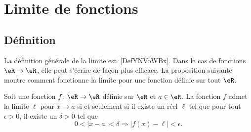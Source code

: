 
\section{Limite de fonctions}

\subsection{Définition}

La définition générale de la limite est~\ref{DefYNVoWBx}. Dans le cas de fonctions \( \eR\to \eR\), elle peut s'écrire de façon plus efficace. La proposition suivante montre comment fonctionne la limite pour une fonction définie sur tout \( \eR\).

\begin{proposition}       \label{PropAJQQooQQClfp}
	Soit une fonction \( f\colon \eR\to \eR\) définie sur \( \eR\) et \( a\in \eR\). La fonction \( f\) admet la limite \( \ell\) pour \( x\to a\) si et seulement si il existe un réel \( \ell\) tel que pour tout \( \epsilon>0\), il existe un \( \delta>0\) tel que
	\begin{equation}\label{EqDefLimiteFonction}
		0<| x-a |<\delta\Rightarrow| f(x)-\ell |<\epsilon.
	\end{equation}
\end{proposition}


